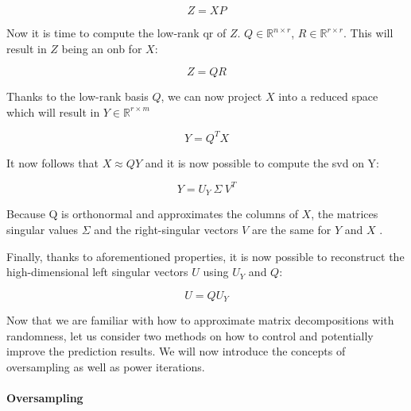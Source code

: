 \vspace{-4mm}
\begin{equation}
	\label{formula:rSVDstepONE}
	Z = X P
\end{equation}

Now it is time to compute the low-rank \gls{qr} of $Z$.
$Q \in \mathbb{R}^{n \times r}$, $R \in \mathbb{R}^{r \times r}$. 
This will result in $Z$ being an \gls{onb} for $X$:

\vspace{-4mm}
\begin{equation}
	\label{formula:rSVDstepTWO}
	Z = Q R
\end{equation}

Thanks to the low-rank basis $Q$, we can now project $X$ into a reduced space which will result in $Y \in \mathbb{R}^{r \times m}$

\vspace{-4mm}
\begin{equation}
	\label{formula:rSVDstepTHREE}
	Y = Q^T X
\end{equation}

It now follows that $X \approx QY$ \cite{brunton2019data} and it is now possible to compute the \gls{svd} on Y:

\vspace{-4mm}
\begin{equation}
	\label{formula:rSVDstepFOUR}
	Y = U_Y \ \Sigma \ V^T
\end{equation}

Because Q is orthonormal and approximates the columns of $X$, the matrices singular values $\Sigma$ and the right-singular vectors $V$ are the same for $Y$ and $X$ \cite{brunton2019data}.

\clearpage


Finally, thanks to aforementioned properties, it is now possible to reconstruct the high-dimensional left singular vectors $U$ using $U_Y$ and $Q$:

\vspace{-4mm}
\begin{equation}
	\label{formula:rSVDstepFIVE}
	U = Q U_Y
\end{equation}
\smallskip


Now that we are familiar with how to approximate matrix decompositions with randomness, let us consider two methods on how to control and potentially improve the prediction results.
We will now introduce the concepts of oversampling as well as power iterations.

\paragraph{Oversampling}

